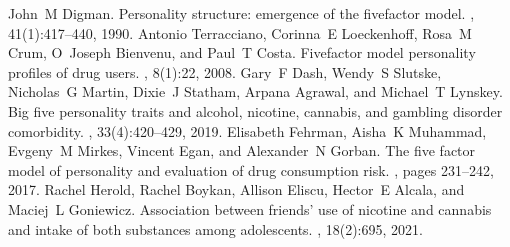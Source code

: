 \documentclass[letterpaper,10pt,english]{jupyterBook}
\begin{document}
\begin{DUlineblock}{0em}
\item[] 
\end{DUlineblock}

\begin{sphinxthebibliography}{1}
\sphinxAtStartPar
John M Digman. Personality structure: emergence of the five\sphinxhyphen{}factor model. , 41(1):417–440, 1990.
\sphinxAtStartPar
Antonio Terracciano, Corinna E Loeckenhoff, Rosa M Crum, O Joseph Bienvenu, and Paul T Costa. Five\sphinxhyphen{}factor model personality profiles of drug users. , 8(1):22, 2008.
\sphinxAtStartPar
Gary F Dash, Wendy S Slutske, Nicholas G Martin, Dixie J Statham, Arpana Agrawal, and Michael T Lynskey. Big five personality traits and alcohol, nicotine, cannabis, and gambling disorder comorbidity. , 33(4):420–429, 2019.
\sphinxAtStartPar
Elisabeth Fehrman, Aisha K Muhammad, Evgeny M Mirkes, Vincent Egan, and Alexander N Gorban. The five factor model of personality and evaluation of drug consumption risk. , pages 231–242, 2017.
\sphinxAtStartPar
Rachel Herold, Rachel Boykan, Allison Eliscu, Hector E Alcala, and Maciej L Goniewicz. Association between friends' use of nicotine and cannabis and intake of both substances among adolescents. , 18(2):695, 2021.
\end{sphinxthebibliography}







\renewcommand{\indexname}{Index}
\printindex
\end{document}
